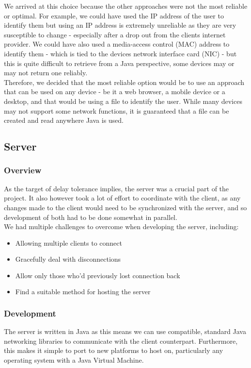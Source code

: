 \documentclass[11pt]{article}
\begin{document}
We arrived at this choice because the other approaches were not the most reliable or optimal. For example, we could have used the IP address of the user to identify them but using an IP address is extremely unreliable as they are very susceptible to change - especially after a drop out from the clients internet provider. We could have also used a media-access control (MAC) address to identify them - which is tied to the devices network interface card (NIC) - but this is quite difficult to retrieve from a Java perspective, some devices may or may not return one reliably. \\

Therefore, we decided that the most reliable option would be to use an approach that can be used on any device - be it a web browser, a mobile device or a desktop, and that would be using a file to identify the user. While many devices may not support some network functions, it is guaranteed that a file can be created and read anywhere Java is used. 

\newpage
\subsection{Server}
\subsubsection{Overview}
As the target of delay tolerance implies, the server was a crucial part of the project. It also however took a lot of effort to coordinate with the client, as any changes made to the client would need to be synchronized with the server, and so development of both had to be done somewhat in parallel. \\

We had multiple challenges to overcome when developing the server, including: \\

\begin{itemize}
	\item Allowing multiple clients to connect
	\item Gracefully deal with disconnections
	\item Allow only those who'd previously lost connection back
	\item Find a suitable method for hosting the server
\end{itemize}


\subsubsection{Development}
The server is written in Java as this means we can use compatible, standard Java networking libraries to communicate with the client counterpart. Furthermore, this makes it simple to port to new platforms to host on, particularly any operating system with a Java Virtual Machine. \\
\end{document}
